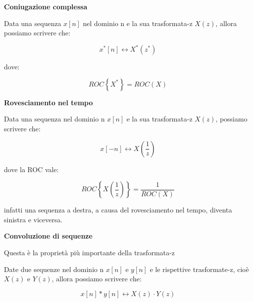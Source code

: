 \textbf{Coniugazione complessa} \newline 

Data una sequenza $x \left[ n\right]$ nel dominio n e la sua trasformata-z $X \left(z\right)$, 
allora possiamo scrivere che: 

{
    \Large 
    \begin{equation}
        x^{*} \left[ n\right]
        \leftrightarrow 
        X^{*} \left(z^{*}\right)
    \end{equation}
}

dove: 

{
    \Large 
    \begin{equation}
        ROC \left\{ X^{*} \right\}
        = 
        ROC \left( X \right) 
    \end{equation}
} 

\newpage 

\textbf{Rovesciamento nel tempo} \newline

Data una sequenza nel dominio n $x \left[ n\right]$ e la sua trasformata-z $X \left( z\right)$, 
possiamo scrivere che: 

{
    \Large 
    \begin{equation}
        x \left[ - n\right]
        \leftrightarrow 
        X \left( \dfrac{1}{z}\right)
    \end{equation}
}

dove la ROC vale: 

{
    \Large 
    \begin{equation}
        ROC \left\{ X \left( \dfrac{1}{z}\right) \right\} 
        = 
        \dfrac{1}{ROC \left(X\right)}
    \end{equation}
}

infatti una sequenza a destra, a causa del rovesciamento nel tempo, diventa sinistra e viceversa. \newline 

\textbf{Convoluzione di sequenze} \newline

\begin{tcolorbox}
    Questa è la proprietà più importante della trasformata-z 
\end{tcolorbox}

Date due sequenze nel dominio n $x \left[ n\right]$ e $y \left[ n\right]$ e le rispettive trasformate-z, 
cioè $X \left( z\right)$ e $Y \left( z\right)$, allora possiamo scrivere che: 

{
    \Large 
    \begin{equation}
        x \left[ n\right] * y \left[ n\right]
        \leftrightarrow 
        X \left(z \right) \cdot Y \left( z\right)
    \end{equation}
}

